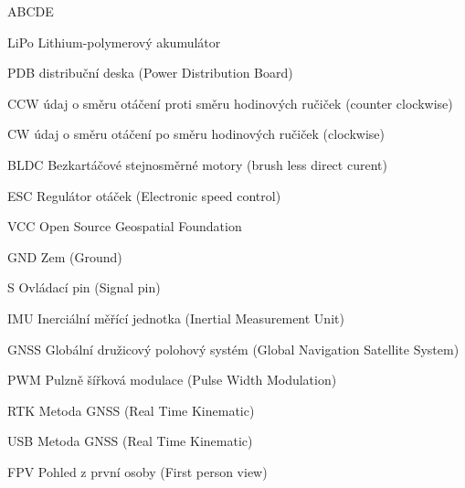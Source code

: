 
\begin{seznamzkratek}{ABCDE}      
	      
		  {LiPo}
	      {Lithium-polymerový akumulátor}
	      
	      {PDB}
	      {distribuční deska  (Power Distribution Board)}

	      {CCW}
	      {údaj o směru otáčení proti směru hodinových ručiček  (counter clockwise)}
	         
	      {CW}
	      {údaj o směru otáčení po směru hodinových ručiček (clockwise)}

	      {BLDC}
	      {Bezkartáčové stejnosměrné motory (brush less direct curent)}
	      
	      {ESC}
	      {Regulátor otáček (Electronic speed control)}	      
	    
	      {VCC}
	      {Open Source Geospatial Foundation} 
  
  		  {GND}
          {Zem (Ground)} 
          
          {S}
          {Ovládací pin (Signal pin)} 

		  {IMU}
          {Inerciální měřící jednotka (Inertial Measurement Unit)} 
          
          {GNSS}
          {Globální družicový polohový systém (Global Navigation Satellite System)} 
          
          {PWM}
          {Pulzně šířková modulace (Pulse Width Modulation)}
          
          {RTK}
          {Metoda GNSS (Real Time Kinematic)}
          
          {USB}
          {Metoda GNSS (Real Time Kinematic)}
          
          {FPV}
          {Pohled z první osoby (First person view)}
          

\end{seznamzkratek}
